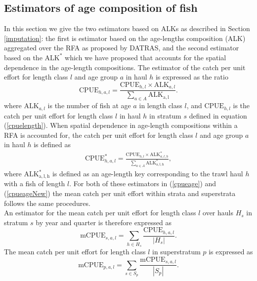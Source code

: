 \documentclass[a4paper 12pt]{article}
\numberwithin{equation}{section}
\begin{document}
\subsection{Estimators of age composition of fish}
\label{agecom}
In this section we give the two estimators based on ALKs as described in Section \ref{imputation}: the first is estimator based on the age-lengths  composition (ALK) aggregated over the RFA as proposed by DATRAS, and the second estimator based on the $\mathrm{ALK}^*$ which we have proposed that accounts for the spatial dependence in the age-length compositions. The estimator of the catch per unit effort for length class $l$ and age group $a$ in haul $h$ is expressed as the ratio
\begin{equation}
\mathrm{CPUE}_{h,a,l} =  \displaystyle \frac{\mathrm{CPUE}_{h,l} \times \mathrm{ALK}_{a,l}}{\displaystyle \sum\limits_{a \in A} \mathrm{ALK_{a,l}}}.
\label{cpueage}
\end{equation}
\noindent where $\mathrm{ALK}_{a,l} $ is the number of fish at age $a$ in length class $l$, and $\mathrm{CPUE}_{h,l} $ is the catch per unit effort for length class $l$ in haul $h$ in stratum $s$ defined in equation (\ref{cpuelength}).  When spatial dependence in age-length compositions within a RFA is accounted for,  the catch per unit effort for length class $l$ and age group $a$ in haul $h$ is defined as
\begin{align}\label{cpueageNew}
\mathrm{CPUE}^*_{h,a,l} =  \displaystyle \frac{\mathrm{CPUE}_{h,l} \times \mathrm{ALK}_{a,l,h}^*}{\displaystyle \sum\limits_{a \in A} \mathrm{ALK_{a,l,h}^*}},
\end{align}
where $\mathrm{ALK_{a,l,h}^*}$ is defined as an age-length key corresponding to the trawl haul $h$  with a fish of length $l$. For both of these estimators in (\ref{cpueage}) and (\ref{cpueageNew}) the mean catch per unit effort within  strata and superstrata follows the same procedures. \\
\indent An estimator for the mean catch per unit effort for length class $l$ over hauls $H_{s}$ in stratum $s$ by year and quarter is therefore expressed as 
 \begin{equation}
\mathrm{mCPUE}_{s,a,l} = \sum\limits_{h \in H_{s}} \frac{\mathrm{CPUE}_{h,a,l}}{|H_{s}|}.
\label{mcpueage}
\end{equation} 
The mean catch per unit effort for length class $l$ in superstratum $p$ is expressed as
\begin{equation}
\mathrm{mCPUE}_{p,a,l} =  \sum\limits_{s \in S_{p}} \frac{\mathrm{mCPUE}_{s,a,l}}{|S_{p}|}.
\label{mcpueagerfa}
\end{equation}
\end{document}
